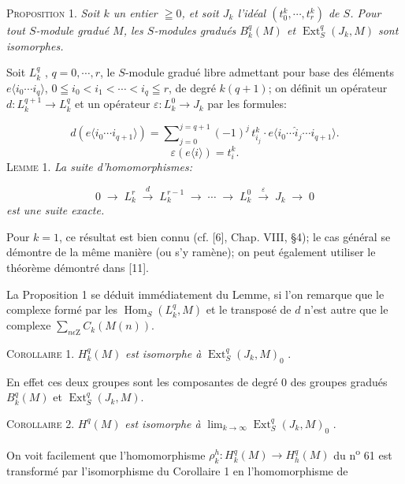 \textsc{Proposition} 1. \textit{Soit $k$ un entier $\geqq 0$, et soit $J_k$ l'idéal $(t_0^k , \cdots , t_r^k)$ de $S$. Pour tout $S$-module gradué $M$, les $S$-modules gradués $B_k^q(M)$ et $\operatorname{Ext}_S^q(J_k , M)$ sont isomorphes.}

Soit $L_k^q$ , $q = 0, \cdots , r$, le $S$-module gradué libre admettant pour base des éléments $e\langle i_0 \cdots i_q \rangle$, $0 \leqq i_0 < i_1 < \cdots < i_q \leqq r$, de degré $k(q + 1)$; on définit un opérateur $d:L_k^{q+1} \to L_k^q$ et un opérateur $\varepsilon:L_k^0 \to J_k$ par les formules:

\begin{equation*}
d(e\langle i_0 \cdots i_{q+1} \rangle) = \sum\nolimits_{j=0}^{j=q+1} (-1)^j \, t_{i_j}^k \cdot e\langle i_0 \cdots \hat{i}_j \cdots i_{q+1} \rangle.
\end{equation*}
\begin{equation*}
\varepsilon(e\langle i \rangle) = t_i^k .
\end{equation*}
\textsc{Lemme} 1. \textit{La suite d'homomorphismes:}

\begin{equation*}
0 \; \to \; L_k^r \; \stackrel{d}{\longrightarrow} \; L_k^{r-1} \; \to \; \cdots \; \to \; L_k^0 \; \stackrel{\varepsilon}{\longrightarrow} \; J_k \; \to \; 0
\end{equation*}
\textit{est une suite exacte.}

Pour $k = 1$, ce résultat est bien connu (cf. [6], Chap. VIII, \S4); le cas général se démontre de la même manière (ou s'y ramène); on peut également utiliser le théorème démontré dans [11].



La Proposition 1 se déduit immédiatement du Lemme, si l'on remarque que le complexe formé par les $\operatorname{Hom}_S(L_k^q, M)$ et le transposé de $d$ n'est autre que le complexe $\sum_{n \epsilon \mathrm{Z}} C_k(M(n))$.

\textsc{Corollaire} 1. $H_k^q(M)$ \textit{est isomorphe à} $\operatorname{Ext}_S^q(J_k , M)_0$ .

En effet ces deux groupes sont les composantes de degré 0 des groupes gradués $B_k^q(M)$ et $\operatorname{Ext}_S^q(J_k , M)$.

\textsc{Corollaire} 2. $H^q(M)$ \textit{est isomorphe à} $\lim_{k \to \infty} \operatorname{Ext}_S^q(J_k , M)_0$ .

On voit facilement que l'homomorphisme $\rho_k^h : H_k^q(M) \to H_h^q(M)$ du n\textsuperscript{o} 61 est transformé par l'isomorphisme du Corollaire 1 en l'homomorphisme de

